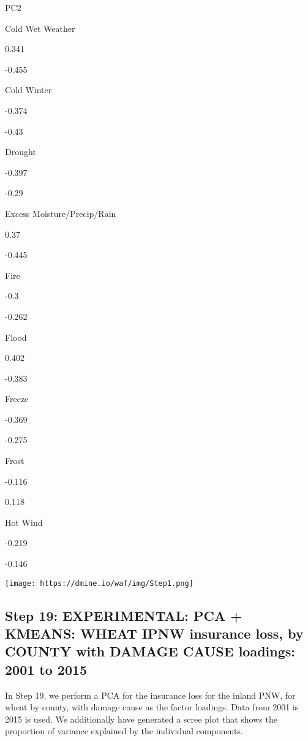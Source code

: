 \documentclass[]{article}
\begin{document}
PC2

Cold Wet Weather

0.341

-0.455

Cold Winter

-0.374

-0.43

Drought

-0.397

-0.29

Excess Moisture/Precip/Rain

0.37

-0.445

Fire

-0.3

-0.262

Flood

0.402

-0.383

Freeze

-0.369

-0.275

Frost

-0.116

0.118

Hot Wind

-0.219

-0.146

\texttt{[image: https://dmine.io/waf/img/Step1.png]}

\hypertarget{step-19-experimental-pca-kmeans-wheat-ipnw-insurance-loss-by-county-with-damage-cause-loadings-2001-to-2015}{%
\subsection{Step 19: EXPERIMENTAL: PCA + KMEANS: WHEAT IPNW insurance
loss, by COUNTY with DAMAGE CAUSE loadings: 2001 to
2015}\label{step-19-experimental-pca-kmeans-wheat-ipnw-insurance-loss-by-county-with-damage-cause-loadings-2001-to-2015}}

In Step 19, we perform a PCA for the insurance loss for the inland PNW,
for wheat by county, with damage cause as the factor loadings. Data from
2001 is 2015 is used. We additionally have generated a scree plot that
shows the proportion of variance explained by the individual components.
\end{document}
